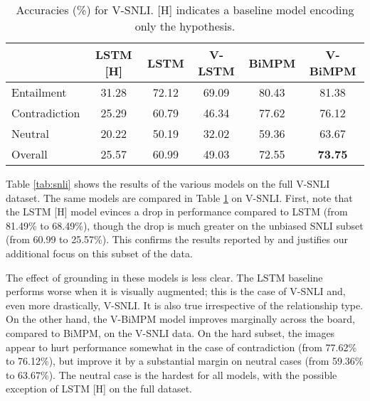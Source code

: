 \documentclass[11pt]{article}
\newcommand{\cut}[1]{}
\begin{document}
\begin{table}
\small
\begin{center}
\begin{tabular}{|l|c||cccc|}
\hline
  & LSTM [H] & LSTM  & V-LSTM  & BiMPM &V-BiMPM  \\\hline
Entailment &  31.28 & 72.12&  69.09  &  80.43 & 81.38 \\
Contradiction & 25.29 & 60.79 &  46.34    & 77.62 & 76.12 \\
Neutral & 20.22 & 50.19 &  32.02 &   59.36 & 63.67\\\hline
Overall & 25.57 & 60.99 &   49.03 &   72.55 & \textbf{73.75} \\
\hline
\end{tabular}
\end{center}
\caption{Accuracies (\%) for V-SNLI. [H] indicates a baseline model encoding only the hypothesis.} \label{tab:hard}
\end{table}
 

Table \ref{tab:snli} shows the results of the various models on the
full V-SNLI dataset. The same models are compared in Table
\ref{tab:hard} on V-SNLI. First, note that the LSTM [H] model
evinces a drop in performance compared to LSTM (from 81.49\% to
68.49\%), though the drop is much greater on the unbiased
SNLI subset (from 60.99 to 25.57\%). This confirms the results reported by
 and justifies our additional focus on this
subset of the data.

The effect of grounding in these models is less clear. The
LSTM baseline performs worse when it is visually augmented; this is the case of
V-SNLI and, even more drastically, V-SNLI. It is also true
irrespective of the relationship type. On the other hand, the V-BiMPM
model improves marginally across the board, compared to BiMPM, on the
V-SNLI data. On the hard subset, the images appear to hurt performance
somewhat in the case of contradiction (from 77.62\% to 76.12\%), but
improve it by a substantial margin on neutral cases (from 59.36\% to
63.67\%).  The neutral case is the hardest for all models, with the
possible exception of LSTM [H] on the full dataset.

\cut{H+I A comparison of V-LSTM and V-BiMPM with their counterparts lacking the
premise (the [H+I]) cases shows that, as in the unimodal case,
performance of the grounded model drops when the premise is not
encoded, even in the presence of images. Once again, the drop is
larger on V-SNLI in both cases. Thus, the observation that
the premise matters in the TE task, and more so on a dataset that is
relatively free of annotation biases, holds true also of the grounded
case.} 
\end{document}
